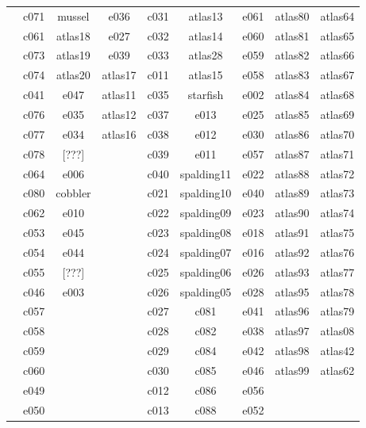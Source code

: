 \documentclass[10pt,letterpaper]{article}
\begin{document}
\begin{center}
\begin{tabular}{ |c|c|c|c|c|c|c|c|c| }
        & c071 & mussel  & e036    & c031 & atlas13    & e061 & atlas80 & atlas64 \\
        & c061 & atlas18 & e027    & c032 & atlas14    & e060 & atlas81 & atlas65 \\
        & c073 & atlas19 & e039    & c033 & atlas28    & e059 & atlas82 & atlas66 \\
        & c074 & atlas20 & atlas17 & c011 & atlas15    & e058 & atlas83 & atlas67 \\
        & c041 & e047    & atlas11 & c035 & starfish   & e002 & atlas84 & atlas68 \\
        & c076 & e035    & atlas12 & c037 & e013       & e025 & atlas85 & atlas69 \\
        & c077 & e034    & atlas16 & c038 & e012       & e030 & atlas86 & atlas70 \\
        & c078 & [???]   &         & c039 & e011       & e057 & atlas87 & atlas71 \\
        & c064 & e006    &         & c040 & spalding11 & e022 & atlas88 & atlas72 \\
        & c080 & cobbler &         & c021 & spalding10 & e040 & atlas89 & atlas73 \\
        & c062 & e010    &         & c022 & spalding09 & e023 & atlas90 & atlas74 \\
        & c053 & e045    &         & c023 & spalding08 & e018 & atlas91 & atlas75 \\
        & c054 & e044    &         & c024 & spalding07 & e016 & atlas92 & atlas76 \\
        & c055 & [???]   &         & c025 & spalding06 & e026 & atlas93 & atlas77 \\
        & c046 & e003    &         & c026 & spalding05 & e028 & atlas95 & atlas78 \\
        & c057 &         &         & c027 & c081       & e041 & atlas96 & atlas79 \\
        & c058 &         &         & c028 & c082       & e038 & atlas97 & atlas08 \\
        & c059 &         &         & c029 & c084       & e042 & atlas98 & atlas42 \\
        & c060 &         &         & c030 & c085       & e046 & atlas99 & atlas62 \\
        & e049 &         &         & c012 & c086       & e056 &         &         \\
        & e050 &         &         & c013 & c088       & e052 &         &         \\

\end{tabular}
\end{center}
\end{document}
